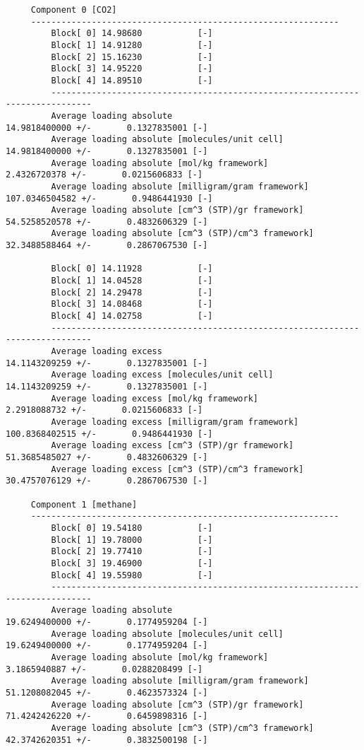 \begin{tiny}
\begin{verbatim}
     Component 0 [CO2]
     -------------------------------------------------------------
         Block[ 0] 14.98680           [-]
         Block[ 1] 14.91280           [-]
         Block[ 2] 15.16230           [-]
         Block[ 3] 14.95220           [-]
         Block[ 4] 14.89510           [-]
         ------------------------------------------------------------------------------
         Average loading absolute                             14.9818400000 +/-       0.1327835001 [-]
         Average loading absolute [molecules/unit cell]       14.9818400000 +/-       0.1327835001 [-]
         Average loading absolute [mol/kg framework]                  2.4326720378 +/-       0.0215606833 [-]
         Average loading absolute [milligram/gram framework]        107.0346504582 +/-       0.9486441930 [-]
         Average loading absolute [cm^3 (STP)/gr framework]          54.5258520578 +/-       0.4832606329 [-]
         Average loading absolute [cm^3 (STP)/cm^3 framework]        32.3488588464 +/-       0.2867067530 [-]

         Block[ 0] 14.11928           [-]
         Block[ 1] 14.04528           [-]
         Block[ 2] 14.29478           [-]
         Block[ 3] 14.08468           [-]
         Block[ 4] 14.02758           [-]
         ------------------------------------------------------------------------------
         Average loading excess                             14.1143209259 +/-       0.1327835001 [-]
         Average loading excess [molecules/unit cell]       14.1143209259 +/-       0.1327835001 [-]
         Average loading excess [mol/kg framework]                    2.2918088732 +/-       0.0215606833 [-]
         Average loading excess [milligram/gram framework]          100.8368402515 +/-       0.9486441930 [-]
         Average loading excess [cm^3 (STP)/gr framework]            51.3685485027 +/-       0.4832606329 [-]
         Average loading excess [cm^3 (STP)/cm^3 framework]          30.4757076129 +/-       0.2867067530 [-]

     Component 1 [methane]
     -------------------------------------------------------------
         Block[ 0] 19.54180           [-]
         Block[ 1] 19.78000           [-]
         Block[ 2] 19.77410           [-]
         Block[ 3] 19.46900           [-]
         Block[ 4] 19.55980           [-]
         ------------------------------------------------------------------------------
         Average loading absolute                             19.6249400000 +/-       0.1774959204 [-]
         Average loading absolute [molecules/unit cell]       19.6249400000 +/-       0.1774959204 [-]
         Average loading absolute [mol/kg framework]                  3.1865940887 +/-       0.0288208499 [-]
         Average loading absolute [milligram/gram framework]         51.1208082045 +/-       0.4623573324 [-]
         Average loading absolute [cm^3 (STP)/gr framework]          71.4242426220 +/-       0.6459898316 [-]
         Average loading absolute [cm^3 (STP)/cm^3 framework]        42.3742620351 +/-       0.3832500198 [-]


\end{verbatim}
\end{tiny}
